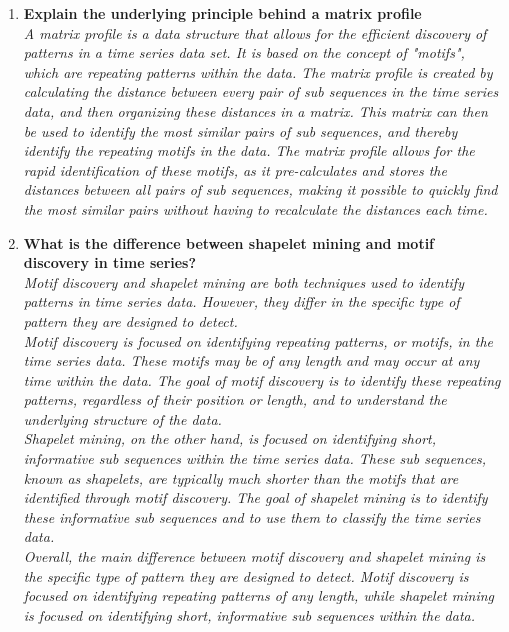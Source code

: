 \documentclass{article}
\begin{document}
\begin{enumerate}
    \item \textbf{Explain the underlying principle behind a matrix profile} \\
    \textit{A matrix profile is a data structure that allows for the efficient discovery of patterns in a time series data set. It is based on the concept of "motifs", which are repeating patterns within the data. The matrix profile is created by calculating the distance between every pair of sub sequences in the time series data, and then organizing these distances in a matrix. This matrix can then be used to identify the most similar pairs of sub sequences, and thereby identify the repeating motifs in the data. The matrix profile allows for the rapid identification of these motifs, as it pre-calculates and stores the distances between all pairs of sub sequences, making it possible to quickly find the most similar pairs without having to recalculate the distances each time.} \\
    \item \textbf{What is the difference between shapelet mining and motif discovery in time series?} \\
    \textit{Motif discovery and shapelet mining are both techniques used to identify patterns in time series data. However, they differ in the specific type of pattern they are designed to detect.\\ Motif discovery is focused on identifying repeating patterns, or motifs, in the time series data. These motifs may be of any length and may occur at any time within the data. The goal of motif discovery is to identify these repeating patterns, regardless of their position or length, and to understand the underlying structure of the data. \\ Shapelet mining, on the other hand, is focused on identifying short, informative sub sequences within the time series data. These sub sequences, known as shapelets, are typically much shorter than the motifs that are identified through motif discovery. The goal of shapelet mining is to identify these informative sub sequences and to use them to classify the time series data.\\ Overall, the main difference between motif discovery and shapelet mining is the specific type of pattern they are designed to detect. Motif discovery is focused on identifying repeating patterns of any length, while shapelet mining is focused on identifying short, informative sub sequences within the data.} \\
\end{enumerate}
\end{document}

